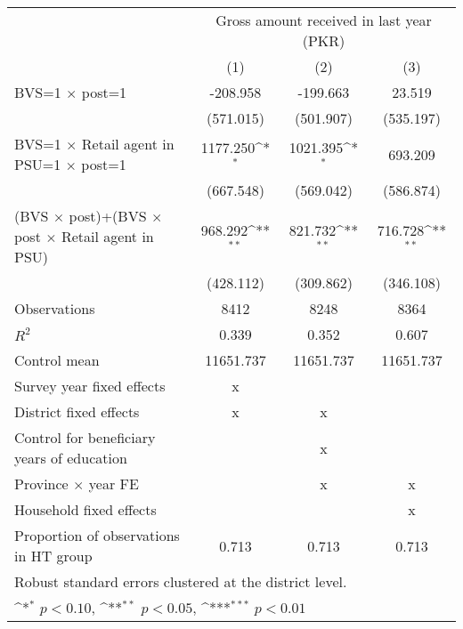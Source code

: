 {
\def\sym#1{\ifmmode^{#1}\else\(^{#1}\)\fi}
\begin{tabular}{l*{3}{c}}
\toprule
                    &\multicolumn{3}{c}{Gross amount received in last year (PKR)}     \\\cmidrule(lr){2-4}
                    &\multicolumn{1}{c}{(1)}         &\multicolumn{1}{c}{(2)}         &\multicolumn{1}{c}{(3)}         \\
\midrule
BVS=1 $\times$ post=1&    -208.958         &    -199.663         &      23.519         \\
                    &   (571.015)         &   (501.907)         &   (535.197)         \\
\addlinespace
BVS=1 $\times$ Retail agent in PSU=1 $\times$ post=1&    1177.250\sym{*}  &    1021.395\sym{*}  &     693.209         \\
                    &   (667.548)         &   (569.042)         &   (586.874)         \\
\addlinespace
\hline (BVS $\times$ post)+(BVS $\times$  post $\times$ Retail agent in PSU)&     968.292\sym{**} &     821.732\sym{**} &     716.728\sym{**} \\
                    &   (428.112)         &   (309.862)         &   (346.108)         \\
\midrule
Observations        &        8412         &        8248         &        8364         \\
\(R^{2}\)           &       0.339         &       0.352         &       0.607         \\
Control mean        &   11651.737         &   11651.737         &   11651.737         \\
Survey year fixed effects&           x         &                     &                     \\
District fixed effects&           x         &           x         &                     \\
Control for beneficiary years of education&                     &           x         &                     \\
Province $\times$  year FE&                     &           x         &           x         \\
Household fixed effects&                     &                     &           x         \\
Proportion of observations in HT group&       0.713         &       0.713         &       0.713         \\
\bottomrule
\multicolumn{4}{l}{\footnotesize Robust standard errors clustered at the district level.}\\
\multicolumn{4}{l}{\footnotesize \sym{*} \(p<0.10\), \sym{**} \(p<0.05\), \sym{***} \(p<0.01\)}\\
\end{tabular}
}
